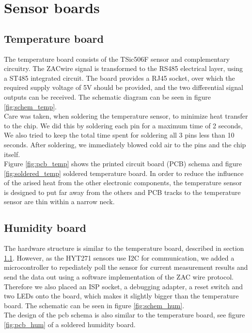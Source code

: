 \documentclass[a4paper]{scrreprt}
\begin{document}
\section{Sensor boards} \label{chap:sensorbrd}
\subsection{Temperature board} \label{chap:tempbrd}
The temperature board consists of the TSic506F sensor and
complementary circuitry. The ZACwire signal is transformed to the
RS485 electrical layer, using a ST485 integrated circuit. The board
provides a RJ45 socket,  over which the required supply voltage of 5V
should be provided, and the two differential signal outputs can be
received. The schematic diagram can be seen in figure
\ref{fig:schem_temp}.\\
Care was taken, when soldering the temperature sensor, to minimize
heat transfer to the chip. We did this by soldering each pin for a
maximum time of 2 seconds, We also tried to keep the total time spent
for soldering all 3 pins less than 10 seconds. After soldering, we
immediately blowed cold air to the pins and the chip itself.\\
Figure \ref{fig:pcb_temp} shows the printed circuit board (PCB) schema and figure \ref{fig:soldered_temp} soldered temperature board. 
In order to reduce the influence of the arised heat from the other electronic components, the temperature sensor is designed to put far away from the others and PCB tracks to the temperature sensor are thin within a narrow neck.
\subsection{Humidity board}
The hardware structure is similar to the temperature board, described in section \ref{chap:tempbrd}. However, as the HYT271 sensors use I2C for
communication, we added a microcontroller to repediately poll the sensor for current measurement results and send the data out using a software
implementation of the ZAC wire protocol. Therefore we also placed an ISP socket, a debugging adapter, a reset switch and two LEDs onto the board, which makes it
slightly bigger than the temperature board. The schematic can be seen in figure \ref{fig:schem_hum}.\\
The design of the pcb schema is also similar to the temperature board, see
figure \ref{fig:pcb_hum} of a soldered humidity board. 
\end{document}
